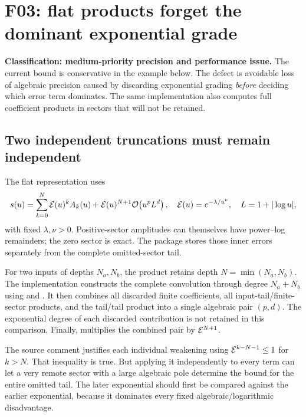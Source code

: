 \section{F03: flat products forget the dominant exponential grade}\label{sec:f03}

\textbf{Classification: medium-priority precision and performance issue.} The current bound is conservative in the example below. The defect is avoidable loss of algebraic precision caused by discarding exponential grading \emph{before} deciding which error term dominates. The same implementation also computes full coefficient products in sectors that will not be retained.


\subsection{Two independent truncations must remain independent}

The flat representation uses
\begin{equation}\label{eq:flat-representation}
 s(u)=\sum_{k=0}^{N}\mathcal{E}(u)^k A_k(u)
       +\mathcal{E}(u)^{N+1}\mathcal{O}\!\left(u^p L^d\right),
 \quad \mathcal{E}(u)=e^{-\lambda/u^\nu},\quad
 L=1+|\log u|,
\end{equation}
with fixed $\lambda,\nu>0$. Positive-sector amplitudes can themselves have power--log remainders; the zero sector is exact. The package stores those inner errors separately from the complete omitted-sector tail.\cite{flat,flatops}

For two inputs of depths $N_a,N_b$, the product retains depth $N=\min(N_a,N_b)$. The implementation constructs the complete convolution through degree $N_a+N_b$ using  and . It then combines all discarded finite coefficients, all input-tail/finite-sector products, and the tail/tail product into a single algebraic pair $(p,d)$. The exponential degree of each discarded contribution is not retained in this comparison. Finally,  multiplies the combined pair by $\mathcal{E}^{N+1}$.\cite{flatops}

The source comment justifies each individual weakening using $\mathcal{E}^{k-N-1}\le1$ for $k>N$. That inequality is true. But applying it independently to every term can let a very remote sector with a large algebraic pole determine the bound for the entire omitted tail. The later exponential should first be compared against the earlier exponential, because it dominates every fixed algebraic/logarithmic disadvantage.

